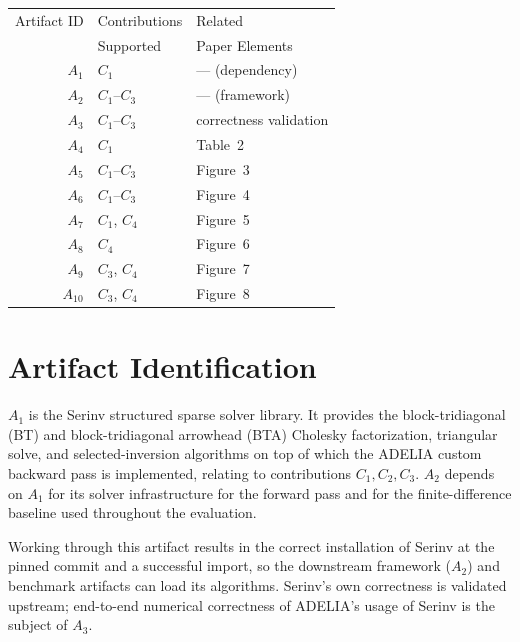 \documentclass[nonacm,sigconf]{acmart}
\begin{document}
\begin{center}
\begin{tabular}{rll}
\toprule
Artifact ID  &  Contributions &  Related \\
             &  Supported     &  Paper Elements \\
\midrule
$A_1$   &  $C_1$         & --- (dependency) \\
$A_2$   &  $C_1$--$C_3$  & --- (framework) \\
\midrule
$A_3$   &  $C_1$--$C_3$  & correctness validation \\
$A_4$   &  $C_1$         & Table~2 \\
$A_5$   &  $C_1$--$C_3$  & Figure~3 \\
$A_6$   &  $C_1$--$C_3$  & Figure~4 \\
$A_7$   &  $C_1$, $C_4$  & Figure~5 \\
$A_8$   &  $C_4$         & Figure~6 \\
$A_9$   &  $C_3$, $C_4$  & Figure~7 \\
$A_{10}$ &  $C_3$, $C_4$ & Figure~8 \\
\bottomrule
\end{tabular}
\end{center}


\section{Artifact Identification}

\newartifact

\artrel

$A_1$ is the Serinv structured sparse solver library. It provides
the block-tridiagonal (BT) and block-tridiagonal arrowhead (BTA) Cholesky factorization, triangular solve, and selected-inversion
algorithms on top of which the ADELIA custom backward pass is
implemented, relating to contributions $C_1, C_2, C_3$. $A_2$ depends on
$A_1$ for its solver infrastructure for the forward pass and for the finite-difference
baseline used throughout the evaluation.

\artexp

Working through this artifact results in the correct installation
of Serinv at the pinned commit and a successful import, so the downstream framework ($A_2$) and benchmark artifacts can load its algorithms. Serinv's own correctness is validated upstream; end-to-end numerical correctness of ADELIA's usage of Serinv is the subject of $A_3$.
\end{document}
